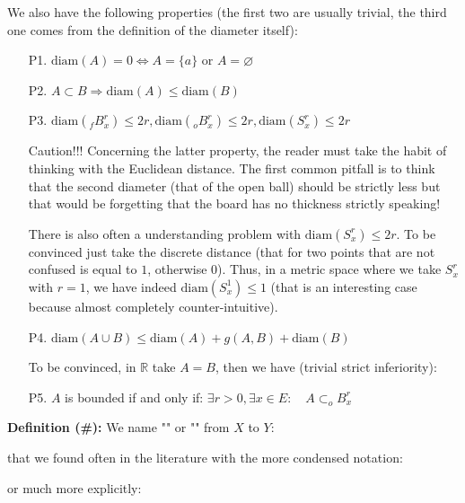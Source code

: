 	We also have the following properties (the first two are usually trivial, the third one comes from the definition of the diameter itself):
	\begin{enumerate}
		\item[P1.] $\text{diam}(A)=0 \Leftrightarrow A=\{a\}$ or $A=\varnothing$
		
		\item[P2.] $A\subset B \Rightarrow \text{diam}(A)\leq \text{diam}(B)$
		
		\item[P3.] $\text{diam}(_fB_x^r)\leq 2r,\text{diam}(_oB_x^r)\leq 2r,\text{diam}(S_x^r)\leq 2r$
		
		\begin{tcolorbox}[colback=red!5,borderline={1mm}{2mm}{red!5},arc=0mm,boxrule=0pt]
		\bcbombe Caution!!! Concerning the latter property, the reader must take the habit of thinking with the Euclidean distance. The first common pitfall is to think that the second diameter (that of the open ball) should be strictly less but that would be forgetting that the board has no thickness strictly speaking! 
		\end{tcolorbox}
		
		There is also often a understanding problem with $\text{diam}(S_x^r)\leq 2r$. To be convinced just take the discrete distance (that for two points that are not confused is equal to $1$, otherwise $0$). Thus, in a metric space where we take $S_x^r$ with $r=1$, we have indeed $\text{diam}(S_x^1)\leq 1$ (that is an interesting case because almost completely counter-intuitive).
		
		\item[P4.] $\text{diam}(A\cup B)\leq \text{diam}(A)+g(A,B)+\text{diam}(B)$
		
		To be convinced, in $\mathbb{R}$ take $A=B$, then we have (trivial strict inferiority):
		
		
		\item[P5.] $A$ is bounded if and only if: $\exists r>0,\exists x\in E:\quad A\subset _oB_x^r$
	\end{enumerate}

	\textbf{Definition (\#\mydef):} We name "" or "" from $X$ to $Y$:
	
	that we found often in the literature with the more condensed notation:
	
	or much more explicitly:
	
